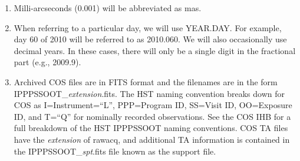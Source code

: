 \begin{enumerate}
	\item{Milli-arcseconds (0.001\arcsec) will be abbreviated as mas. }
	\item{When referring to a particular day, we will use YEAR.DAY. For example, day 60 of 2010 will be referred to as 2010.060.
	We will also occasionally use decimal years. In these cases, there will only be a single digit in the fractional part (e.g., 2009.9).}
	\item{Archived COS files are in FITS format and the filenames are in the form {\sf IPPPSSOOT\_{\it extension}.fits}.
		The HST naming convention breaks down for COS as I=Instrument=``L'', PPP=Program ID, SS=Visit ID, OO=Exposure ID,
		and T=``Q'' for nominally recorded observations. See the COS IHB for a full breakdown of the HST IPPPSSOOT naming conventions.
		COS TA files have the {\it extension} of {\sf rawacq}, and additional TA information is contained in the
		{\sf IPPPSSOOT\_{\it spt}.fits} file known as the support file.}
\end{enumerate}

